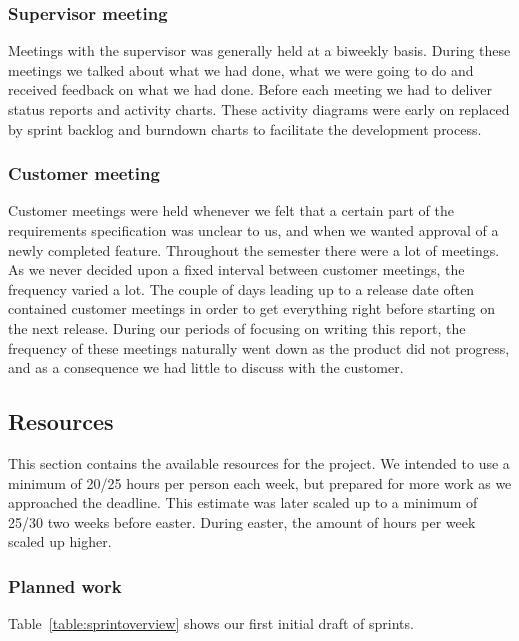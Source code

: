 \subsubsection{Supervisor meeting}
Meetings with the supervisor was generally held at a biweekly basis.
During these meetings we talked about what we had done, what we were
going to do and received feedback on what we had done. Before each
meeting we had to deliver status reports and activity charts. These
activity diagrams were early on replaced by sprint backlog and burndown
charts to facilitate the development process. 

\subsubsection{Customer meeting}
Customer meetings were held whenever we felt that a certain part of the
requirements specification was unclear to us, and when we wanted approval of a
newly completed feature. Throughout the semester there were a lot of meetings.
As we never decided upon a fixed interval between customer meetings, the
frequency varied a lot. The couple of days leading up to a release date often
contained customer meetings in order to get everything right before starting on
the next release. During our periods of focusing on writing this report, the
frequency of these meetings naturally went down as the product did not
progress, and as a consequence we had little to discuss with the customer. 

\subsection{Resources}
This section contains the available resources for the project. We
intended to use a minimum of 20/25 hours per person each week, but
prepared for more work as we approached the deadline. This estimate was
later scaled up to a minimum of 25/30 two weeks before easter. During
easter, the amount of hours per week scaled up higher. 

\subsubsection{Planned work}
Table~\ref{table:sprintoverview} shows our first initial draft of sprints. 

